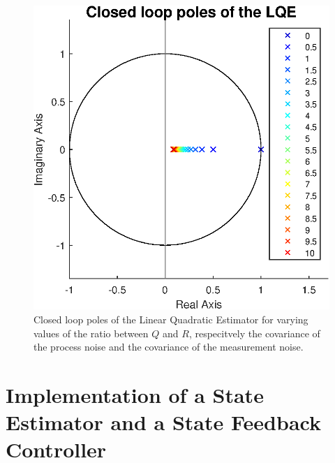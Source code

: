 \documentclass[a4paper,kul]{kulakarticle} %
\begin{document}
\begin{figure}[htp!]
	\centering
	\includegraphics[width=0.5\linewidth]{poles_LQE.eps}
	\caption{Closed loop poles of the Linear Quadratic Estimator for varying values of the ratio between $Q$ and $R$, respecitvely the covariance of the process noise and the covariance of the measurement noise.}
	\label{fig:poles_LQE}
\end{figure}



\newpage
\section{Implementation of a State Estimator and a State Feedback Controller}
\end{document}
